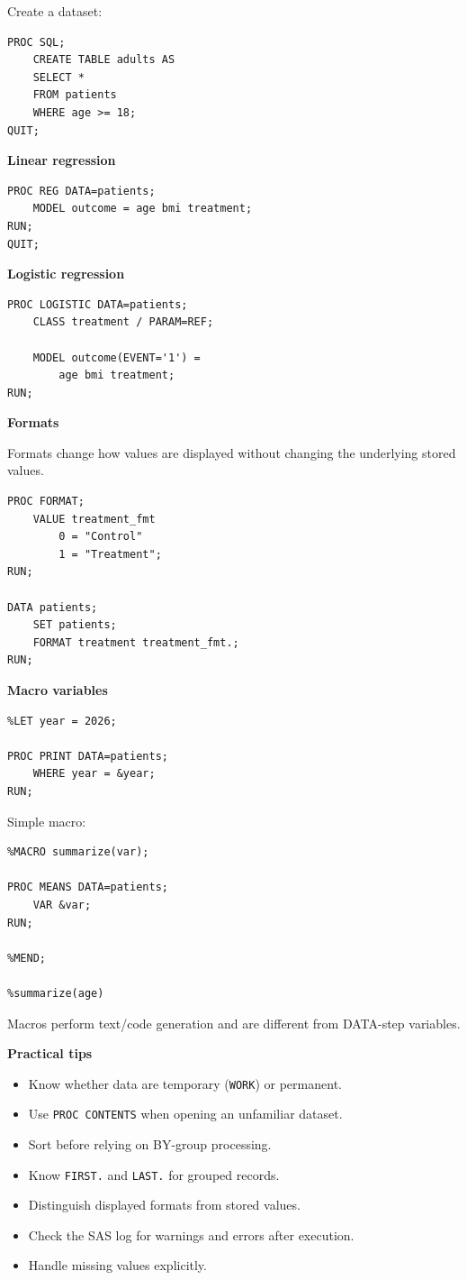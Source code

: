 \documentclass[11pt,letterpaper]{article}
\begin{document}
Create a dataset:

\begin{lstlisting}
PROC SQL;
    CREATE TABLE adults AS
    SELECT *
    FROM patients
    WHERE age >= 18;
QUIT;
\end{lstlisting}

\textbf{Linear regression}

\begin{lstlisting}
PROC REG DATA=patients;
    MODEL outcome = age bmi treatment;
RUN;
QUIT;
\end{lstlisting}

\textbf{Logistic regression}

\begin{lstlisting}
PROC LOGISTIC DATA=patients;
    CLASS treatment / PARAM=REF;

    MODEL outcome(EVENT='1') =
        age bmi treatment;
RUN;
\end{lstlisting}

\textbf{Formats}

Formats change how values are displayed without changing the underlying stored
values.

\begin{lstlisting}
PROC FORMAT;
    VALUE treatment_fmt
        0 = "Control"
        1 = "Treatment";
RUN;

DATA patients;
    SET patients;
    FORMAT treatment treatment_fmt.;
RUN;
\end{lstlisting}

\textbf{Macro variables}

\begin{lstlisting}
%LET year = 2026;

PROC PRINT DATA=patients;
    WHERE year = &year;
RUN;
\end{lstlisting}

Simple macro:

\begin{lstlisting}
%MACRO summarize(var);

PROC MEANS DATA=patients;
    VAR &var;
RUN;

%MEND;

%summarize(age)
\end{lstlisting}

Macros perform text/code generation and are different from DATA-step
variables.

\textbf{Practical tips}

\begin{itemize}[leftmargin=*]
    \item Know whether data are temporary (\texttt{WORK}) or permanent.
    \item Use \texttt{PROC CONTENTS} when opening an unfamiliar dataset.
    \item Sort before relying on BY-group processing.
    \item Know \texttt{FIRST.} and \texttt{LAST.} for grouped records.
    \item Distinguish displayed formats from stored values.
    \item Check the SAS log for warnings and errors after execution.
    \item Handle missing values explicitly.
\end{itemize}
\end{document}
